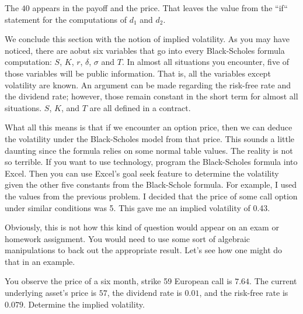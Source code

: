 \documentclass{ximera}
\begin{document}
The $40$ appears in the payoff and the price. That leaves the value from the ``if`` statement for the computations of $d_1$ and $d_2$. 

We conclude this section with the notion of implied volatility. As you may have noticed, there are aobut six variables that go into every Black-Scholes formula computation: $S$, $K$, $r$, $\delta$, $\sigma$ and $T$. In almost all situations you encounter, five of those variables will be public information. That is, all the variables except volatility are known. An argument can be made regarding the risk-free rate and the dividend rate; however, those remain constant in the short term for almost all situations. $S$, $K$, and $T$ are all defined in a contract.

What all this means is that if we encounter an option price, then we can deduce the volatility under the Black-Scholes model from that price. This sounds a little daunting since the formula relies on some normal table values. The reality is not so terrible. If you want to use technology, program the Black-Scholes formula into Excel. Then you can use Excel's goal seek feature to determine the volatility given the other five constants from the Black-Schole formula. For example, I used the values from the previous problem. I decided that the price of some call option under similar conditions was 5. This gave me an implied volatility of 0.43.

Obviously, this is not how this kind of question would appear on an exam or homework assignment. You would need to use some sort of algebraic manipulations to back out the appropriate result. Let's see how one might do that in an example.

\begin{example}
You observe the price of a six month, strike 59  European call is $7.64$. The current underlying asset's price is $57$, the dividend rate is $0.01$, and the risk-free rate is $0.079$. Determine the implied volatility.
\end{example}
\end{document}
